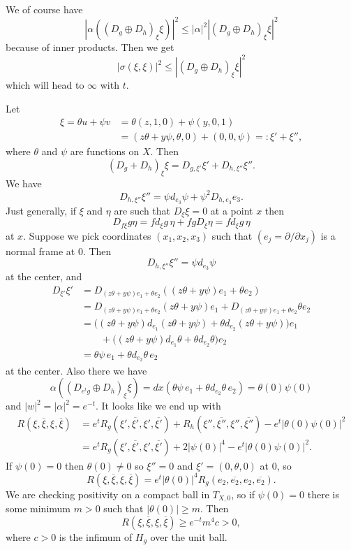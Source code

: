 \documentclass[11pt]{article}
\theoremstyle{definition}
\def\ov#1{\overline{#1}}
\begin{document}
We of course have
$$
|\alpha((D_g \oplus D_h)_\xi \xi)|^2
\leq |\alpha|^2 |(D_g \oplus D_h)_\xi \xi|^2
$$
because of inner products.
Then we get
$$
|\sigma(\xi, \xi)|^2
\leq |(D_g \oplus D_h)_\xi \xi|^2
$$
which will head to $\infty$ with $t$.

Let
\begin{align*}
\xi = \theta u + \psi v
&= \theta (z, 1, 0) + \psi (y, 0, 1)
\\
&= (z \theta + y \psi, \theta, 0) + (0, 0, \psi)
=: \xi' + \xi'',
\end{align*}
where $\theta$ and $\psi$ are functions on $X$.
Then
$$
(D_g + D_h)_\xi \xi
= D_{g,\xi'}\xi' + D_{h,\xi''} \xi''.
$$
We have
$$
D_{h,\xi''} \xi''
= \psi d_{e_3} \psi + \psi^2 D_{h,e_3} e_3.
$$
Just generally, if $\xi$ and $\eta$ are such that $D_\xi \xi = 0$ at a point $x$
then
$$
D_{f \xi} g \eta = f d_\xi g \, \eta + fg D_\xi \eta = f d_\xi g \, \eta
$$
at $x$.
Suppose we pick coordinates $(x_1,x_2,x_3)$ such that $(e_j = \partial
/ \partial x_j)$ is a normal frame at $0$. Then
$$
D_{h,\xi''} \xi''
= \psi d_{e_3} \psi
$$
at the center, and
\begin{align*}
D_{\xi'} \xi'
&= D_{(z\theta + y\psi)e_1 + \theta e_2}((z\theta + y\psi)e_1 + \theta e_2)
\\
&= D_{(z\theta + y\psi)e_1 + \theta e_2}(z\theta + y\psi)e_1
+ D_{(z\theta + y\psi)e_1 + \theta e_2}\theta e_2
\\
&= \bigl(
(z\theta + y\psi)d_{e_1}(z\theta + y\psi)
+ \theta d_{e_2}(z\theta + y\psi)
\bigr) e_1
\\
&\qquad
+ \bigl(
(z\theta + y\psi)d_{e_1}\theta
+ \theta d_{e_2}\theta
\bigr) e_2
\\
&=
\theta \psi \, e_1
+ \theta d_{e_2}\theta
\, e_2
\end{align*}
at the center.
Also there we have
$$
\alpha((D_{e^t g} \oplus D_h)_\xi \xi)
= dx(\theta \psi \, e_1
+ \theta d_{e_2}\theta
\, e_2)
= \theta(0) \psi(0)
$$
and $|w|^2 = |\alpha|^2 = e^{-t}$.
It looks like we end up with
\begin{align*}
R(\xi, \ov\xi, \xi, \ov\xi)
&= e^t R_g(\xi', \ov{\xi'}, \xi', \ov{\xi'})
+ R_h(\xi'', \ov{\xi''}, \xi'', \ov{\xi''})
- e^t |\theta(0) \psi(0)|^2
\\
&= e^t R_g(\xi', \ov{\xi'}, \xi', \ov{\xi'})
+ 2 |\psi(0)|^4
- e^t |\theta(0) \psi(0)|^2.
\end{align*}
If $\psi(0) = 0$ then $\theta(0) \not= 0$
so $\xi'' = 0$ and $\xi' = (0, \theta, 0)$ at $0$, so
$$
R(\xi, \ov\xi, \xi, \ov\xi)
= e^t |\theta(0)|^4 R_g(e_2, \ov{e_2}, e_2, \ov{e_2}).
$$
We are checking positivity on a compact ball in $T_{X,0}$, so if $\psi(0) = 0$
there is some minimum $m > 0$ such that $|\theta(0)| \geq m$. Then
$$
R(\xi, \ov\xi, \xi, \ov\xi)
\geq e^{-t} m^4 c > 0,
$$
where $c > 0$ is the infimum of $H_g$ over the unit ball.
\end{document}

